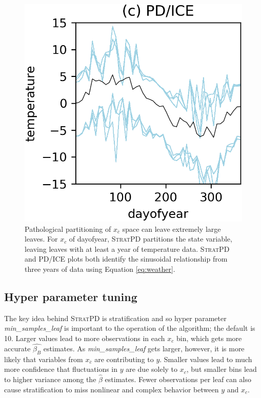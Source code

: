 \documentclass[12pt]{article}
\newcommand{\spd}{\fontfamily{cmr}\textsc{\small StratPD}}
\newcommand{\xnc}{$x_{\overline{c}}$}
\begin{document}
\begin{figure}[htbp]
\begin{center}
\includegraphics[scale=0.7]{images/dayofyear_vs_temp_pdp.png}
\caption{Pathological partitioning of \xnc{} space can leave extremely large leaves. For $x_c$ of dayofyear, \spd{} partitions the state variable, leaving leaves with at least a year of temperature data. \spd{} and PD/ICE plots both identify the sinusoidal relationship from three years of data using Equation \eqref{eq:weather}.}
\label{fig:dayofyear_vs_temp}
\end{center}
\end{figure}

\subsection{Hyper parameter tuning}

The key idea behind \spd{} is stratification and so hyper parameter {\it min\_samples\_leaf} is  important to the operation of the algorithm; the default is 10. Larger values lead to more observations in each $x_c$ bin, which gets more accurate $\hat{\beta_B}$ estimates. As {\it min\_samples\_leaf} gets larger, however, it is more likely that variables from \xnc{} are contributing to $y$.  Smaller values lead to much more confidence that fluctuations in $y$ are due solely to $x_c$, but smaller bins lead to higher variance among the $\hat{\beta}$ estimates. Fewer observations per leaf can also cause stratification to miss nonlinear and complex behavior between $y$ and $x_c$.
\end{document}
